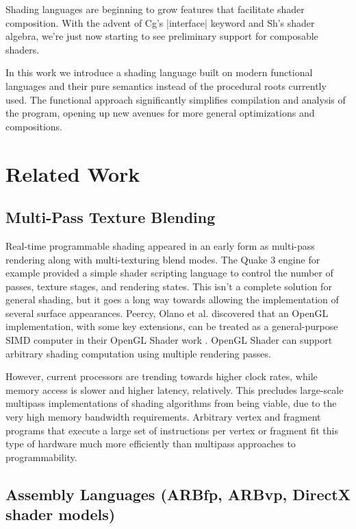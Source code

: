 \documentclass{acmsiggraph}               %
\begin{document}
Shading languages are beginning to grow features that facilitate
shader composition.  With the advent of Cg's |interface| keyword and
Sh's shader algebra, we're just now starting to see preliminary
support for composable shaders.

In this work we introduce a shading language built on modern
functional languages and their pure semantics instead of the
procedural roots currently used. The functional approach significantly
simplifies compilation and analysis of the program, opening up new
avenues for more general optimizations and compositions.

\section{Related Work}

\subsection{Multi-Pass Texture Blending }

Real-time programmable shading appeared in an early form as multi-pass
rendering along with multi-texturing blend modes.  The Quake 3 engine
for example provided a simple shader scripting language to control the
number of passes, texture stages, and rendering states.  This isn't a
complete solution for general shading, but it goes a long way towards
allowing the implementation of several surface appearances.  Peercy,
Olano et al. discovered that an OpenGL implementation, with some key
extensions, can be treated as a general-purpose SIMD computer in their
OpenGL Shader work \cite{peercy00interactive}.  OpenGL Shader can
support arbitrary shading computation using multiple rendering
passes.

However, current processors are trending towards higher clock rates,
while memory access is slower and higher latency, relatively.  This
precludes large-scale multipass implementations of shading algorithms
from being viable, due to the very high memory bandwidth requirements.
Arbitrary vertex and fragment programs that execute a large set of
instructions per vertex or fragment fit this type of hardware much
more efficiently than multipass approaches to programmability.


\subsection{Assembly Languages (ARBfp, ARBvp, DirectX shader models)}
\end{document}
